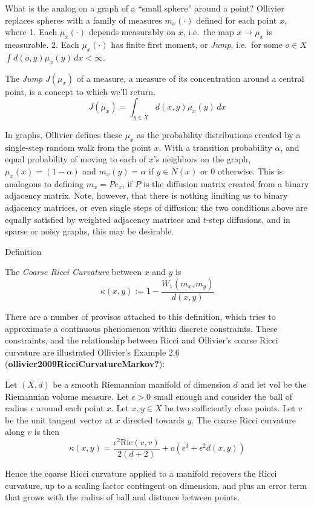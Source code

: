 \documentclass[
]{agujournal2019}
\begin{document}
What is the analog on a graph of a ``small sphere'' around a point?
Ollivier replaces spheres with a family of measures \(m_{x}(\cdot)\)
defined for each point \(x\), where 1. Each \(\mu_{x}(\cdot)\) depends
measurably on \(x\), i.e.~the map \(x \to \mu_{x}\) is measurable. 2.
Each \(\mu_{x}(\cdot)\) has finite first moment, or \emph{Jump},
i.e.~for some \(o \in X\) \(\int d(o,y) \mu_{x}(y) \, dx < \infty\).

The \emph{Jump} \(J(\mu_{x})\) of a measure, a measure of its
concentration around a central point, is a concept to which we'll
return. \[
J(\mu_{x}) = \int_{y \in X} d(x, y) \mu_{x}(y) \, dx 
\]

In graphs, Ollivier defines these \(\mu_x\) as the probability
distributions created by a single-step random walk from the point \(x\).
With a transition probability \(\alpha\), and equal probability of
moving to each of \(x\)'s neighbors on the graph,
\(\mu_{x}(x) = (1-\alpha)\) and \(m_{x}(y) = \alpha\) if \(y \in N(x)\)
or \(0\) otherwise. This is analogous to defining \(m_{x} = P e_{x}\),
if \(P\) is the diffusion matrix created from a binary adjacency matrix.
Note, however, that there is nothing limiting us to binary adjacency
matrices, or even single steps of diffusion; the two conditions above
are equally satisfied by weighted adjacency matrices and \(t\)-step
diffusions, and in sparse or noisy graphs, this may be desirable.

Definition

The \emph{Coarse Ricci Curvature} between \(x\) and \(y\) is
\[\kappa(x, y):=1-\frac{W_1\left(m_x, m_y\right)}{d(x, y)}\]

There are a number of provisos attached to this definition, which tries
to approximate a continuous phenomenon within discrete constraints.
These constraints, and the relationship between Ricci and Ollivier's
coarse Ricci curvature are illustrated Ollivier's Example 2.6
(\textbf{ollivier2009RicciCurvatureMarkov?}):

Let \((X,d)\) be a smooth Riemannian manifold of dimension \(d\) and let
\(\text{vol}\) be the Riemannian volume measure. Let \(\epsilon>0\)
small enough and consider the ball of radius \(\epsilon\) around each
point \(x\). Let \(x,y \in X\) be two sufficiently close points. Let
\(v\) be the unit tangent vector at \(x\) directed towards \(y\). The
coarse Ricci curvature along \(v\) is then
\[\kappa(x,y) = \frac{\epsilon^2 \text{Ric}(v,v)}{2(d+2)}+o(\epsilon^3 + \epsilon^2d(x,y))\]

Hence the coarse Ricci curvature applied to a manifold recovers the
Ricci curvature, up to a scaling factor contingent on dimension, and
plus an error term that grows with the radius of ball and distance
between points.
\end{document}
